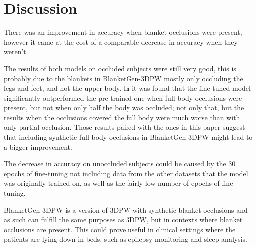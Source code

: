 \documentclass[conference]{IEEEtran}
\begin{document}
\begin{table}[h!]
    \centering
    \caption{Procrustes Analysis Mean Per Joint Position Error (PA-MPJPE) in mm. Procrustes Analysis consists of a series of linear transformations to emphasize the shape rather than the rotation, location, or scale.}
    \label{tab:quantitativetable}
\end{table}



\section{Discussion}
There was an improvement in accuracy when blanket occlusions were present, however it came at the cost of a comparable decrease in accuracy when they weren't.

The results of both models on occluded subjects were still very good, this is probably due to the blankets in BlanketGen-3DPW mostly only occluding the legs and feet, and not the upper body. In \cite{blanketset} it was found that the fine-tuned model significantly outperformed the pre-trained one when full body occlusions were present, but not when only half the body was occluded; not only that, but the results when the occlusions covered the full body were much worse than with only partial occlusion. Those results paired with the ones in this paper suggest that including synthetic full-body occlusions in BlanketGen-3DPW might lead to a bigger improvement.

The decrease in accuracy on unoccluded subjects could be caused by the 30 epochs of fine-tuning not including data from the other datasets that the model was originally trained on, as well as the fairly low number of epochs of fine-tuning. 

BlanketGen-3DPW is a version of 3DPW with synthetic blanket occlusions and as such can fulfill the same purposes as 3DPW, but in contexts where blanket occlusions are present. This could prove useful in clinical settings where the patients are lying down in beds, such as epilepsy monitoring and sleep analysis.
\end{document}
